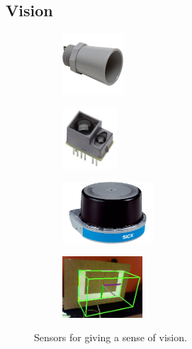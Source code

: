 \subsection{Vision}

\begin{figure}[H]
\begin{subfigure}[b]{.24\linewidth}
\includegraphics[height=0.9in]{imgs/sensor_ultrasonic.jpeg}
\end{subfigure}\begin{subfigure}[b]{.24\linewidth}
\includegraphics[height=0.9in]{imgs/sensor_tof.jpeg}
\end{subfigure}\begin{subfigure}[b]{.24\linewidth}
\includegraphics[height=0.9in]{imgs/sensor_lidar.png}
\end{subfigure}\begin{subfigure}[b]{.24\linewidth}
\includegraphics[height=0.9in]{imgs/sensor_cv.png}
\end{subfigure} %
\caption{Sensors for giving a sense of vision.}
\end{figure}

